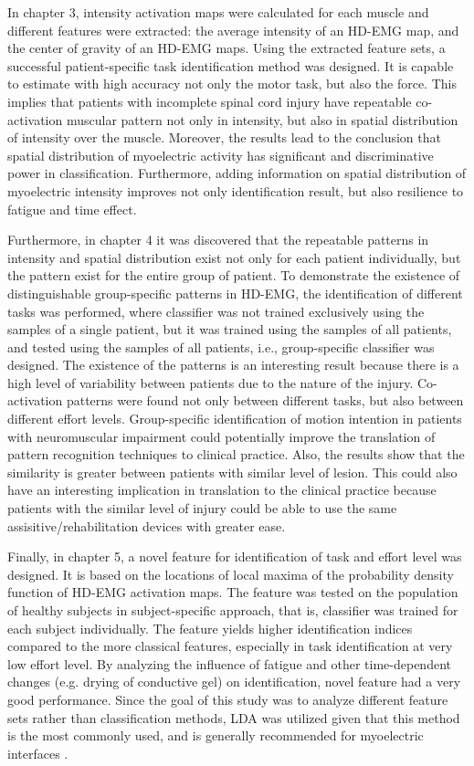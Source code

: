 In chapter 3, intensity activation maps were calculated for each muscle and different features were extracted: the average intensity of an HD-EMG map, and the center of gravity of an HD-EMG maps. Using the extracted feature sets, a successful patient-specific task identification method was designed. It is capable to estimate with high accuracy not only the motor task, but also the force. This implies that patients with incomplete spinal cord injury have repeatable co-activation muscular pattern not only in intensity, but also in spatial distribution of intensity over the muscle. Moreover, the results lead to the conclusion that spatial distribution of myoelectric activity has significant and discriminative power in classification. Furthermore, adding information on spatial distribution of myoelectric intensity improves not only identification result, but also resilience to fatigue and time effect.

Furthermore, in chapter 4 it was discovered that the repeatable patterns in intensity and spatial distribution exist not only for each patient individually, but the pattern exist for the entire group of patient. To demonstrate the existence of distinguishable group-specific patterns in HD-EMG, the identification of different tasks was performed, where classifier was not trained exclusively using the samples of a single patient, but it was trained using the samples of all patients, and tested using the samples of all patients, i.e., group-specific classifier was designed. The existence of the patterns is an interesting result because there is a high level of variability between patients due to the nature of the injury. Co-activation patterns were found not only between different tasks, but also between different effort levels. Group-specific identification of motion intention in patients with neuromuscular impairment could potentially improve the translation of pattern recognition techniques to clinical practice. Also, the results show that the similarity is greater between patients with similar level of lesion. This could also have an interesting implication in translation to the clinical practice because patients with the similar level of injury could be able to use the same assisitive/rehabilitation devices with greater ease. 

Finally, in chapter 5, a novel feature for identification of task and effort level was designed. It is based on the locations of local maxima of the probability density function of HD-EMG activation maps. The feature was tested on the population of healthy subjects in subject-specific approach, that is, classifier was trained for each subject individually. The feature yields higher identification indices compared to the more classical features, especially in task identification at very low effort level. By analyzing the influence of fatigue and other time-dependent changes (e.g. drying of conductive gel) on identification, novel feature had a very good performance. Since the goal of this study was to analyze different feature sets rather than classification methods, LDA was utilized given that this method is the most commonly used, and is generally recommended for myoelectric interfaces \citep{Hakonen2015}.

